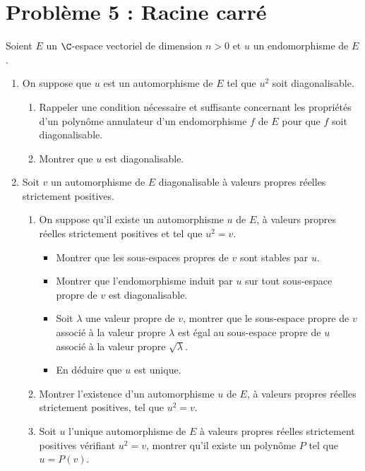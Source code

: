 \documentclass[twoside,french,11pt]{VcCours}
\begin{document}
\section*{Problème 5 : Racine carré}
  Soient $E$ un $\C$-espace vectoriel de dimension $n>0$ et $u$ un endomorphisme de $E$.
  \begin{enumerate}
  \item On suppose que $u$ est un automorphisme de $E$ tel que $u^2$ soit diagonalisable.
  \begin{enumerate}
  \item Rappeler une condition nécessaire et suffisante concernant les propriétés d'un polynôme annulateur d'un endomorphisme $f$ de $E$ pour que $f$ soit diagonalisable.
  \item Montrer que $u$ est diagonalisable.
  \end{enumerate}
  \item Soit $v$ un automorphisme de $E$ diagonalisable à valeurs propres réelles strictement positives.
  \begin{enumerate}
  \item On suppose qu'il existe un automorphisme $u$ de $E$, à valeurs propres réelles strictement positives et tel que $u^2=v$.
  \begin{itemize}
  \item Montrer que les sous-espaces propres de $v$ sont stables par $u$.
  \item Montrer que l'endomorphisme induit par $u$ sur tout sous-espace propre de $v$ est diagonalisable.
  \item Soit $\lambda$ une valeur propre de $v$, montrer que le sous-espace propre de $v$ associé à la valeur propre $\lambda$ est égal au sous-espace propre de $u$ associé à la valeur propre $\sqrt{\lambda}$.
  \item En déduire que $u$ est unique.
  \end{itemize}
  \item Montrer l'existence d'un automorphisme $u$ de $E$, à valeurs propres réelles strictement positives, tel que $u^2=v$.
  \item Soit $u$ l'unique automorphisme de $E$  à valeurs propres réelles strictement positives vérifiant $u^2=v$, montrer qu'il existe un polynôme $P$ tel que $u=P(v)$.
  \end{enumerate}
  \end{enumerate}
  
\end{document}
